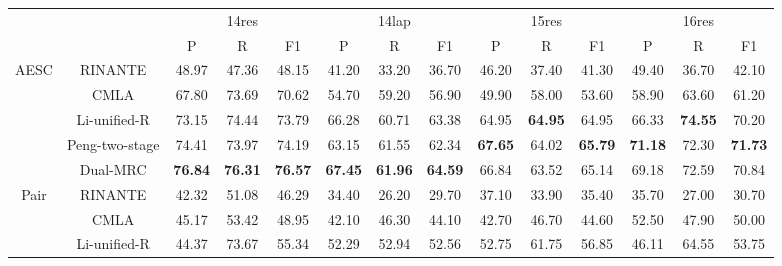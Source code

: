 \documentclass[letterpaper]{article} \usepackage{aaai21}  \usepackage{times}  \usepackage{helvet} \usepackage{courier}  \usepackage[hyphens]{url}  \usepackage{graphicx} \urlstyle{rm} \def\UrlFont{\rm}  \usepackage{natbib}  \usepackage{caption}
\begin{document}
\begin{table*}
    \centering
    \small 
    \begin{tabular}{cc|ccc|ccc|ccc|ccc}
    \hline
    \multicolumn{1}{l}{}                         &                & \multicolumn{3}{c|}{14res}     & \multicolumn{3}{c|}{14lap}     & \multicolumn{3}{c|}{15res}     & \multicolumn{3}{c}{16res}      \\ \cline{3-14} 
    \multicolumn{1}{l}{}                         &                & P     & R     & F1             & P     & R     & F1             & P     & R     & F1             & P     & R     & F1             \\ \hline
    \multicolumn{1}{c|}{\multirow{5}{*}{AESC}}   & RINANTE        & 48.97 & 47.36 & 48.15          & 41.20 & 33.20 & 36.70          & 46.20 & 37.40 & 41.30          & 49.40 & 36.70 & 42.10          \\
    \multicolumn{1}{c|}{}                        & CMLA           & 67.80 & 73.69 & 70.62          & 54.70 & 59.20 & 56.90          & 49.90 & 58.00 & 53.60          & 58.90 & 63.60 & 61.20          \\
    \multicolumn{1}{c|}{}                        & Li-unified-R   & 73.15 & 74.44 & 73.79          & 66.28 & 60.71 & 63.38          & 64.95 & \textbf{64.95} & 64.95          & 66.33 & \textbf{74.55} & 70.20          \\
    \multicolumn{1}{c|}{}                        & Peng-two-stage & 74.41 & 73.97 & 74.19          & 63.15 & 61.55 & 62.34          & \textbf{67.65} & 64.02 & \textbf{65.79} & \textbf{71.18} & 72.30 & \textbf{71.73} \\ \cline{2-14}
    \multicolumn{1}{c|}{}                        & Dual-MRC       & \textbf{76.84} & \textbf{76.31} &\textbf{76.57}  & \textbf{67.45} & \textbf{61.96} & \textbf{64.59} & 66.84 & 63.52 & 65.14          & 69.18 & 72.59 & 70.84          \\ \hline
    \multicolumn{1}{c|}{\multirow{5}{*}{Pair}}   & RINANTE        & 42.32 & 51.08 & 46.29          & 34.40 & 26.20 & 29.70          & 37.10 & 33.90 & 35.40          & 35.70 & 27.00 & 30.70          \\
    \multicolumn{1}{c|}{}                        & CMLA           & 45.17 & 53.42 & 48.95          & 42.10 & 46.30 & 44.10          & 42.70 & 46.70 & 44.60          & 52.50 & 47.90 & 50.00          \\
    \multicolumn{1}{c|}{}                        & Li-unified-R   & 44.37 & 73.67 & 55.34          & 52.29 & 52.94 & 52.56          & 52.75 & 61.75 & 56.85          & 46.11 & 64.55 & 53.75          \\

\end{tabular}
\end{table*}
\end{document}
